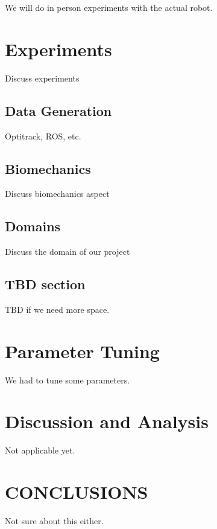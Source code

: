 \documentclass[letterpaper, 10 pt, conference]{ieeeconf}  %
\begin{document}
We will do in person experiments with the actual robot.

\section{Experiments}
Discuss experiments

\subsection{Data Generation}
Optitrack, ROS, etc.

\subsection{Biomechanics}
Discuss biomechanics aspect

\subsection{Domains}
Discuss the domain of our project

\subsection{TBD section}
TBD if we need more space.

\section{Parameter Tuning}
We had to tune some parameters.

\section{Discussion and Analysis}
Not applicable yet.


\section{CONCLUSIONS}
Not sure about this either.

\addtolength{\textheight}{-12cm}   %
\end{document}

